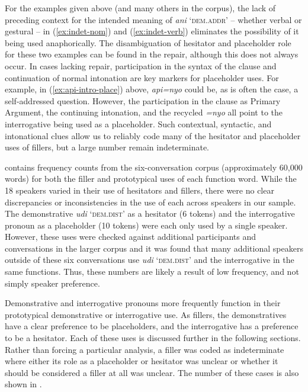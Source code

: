 \documentclass[output=paper,colorlinks,citecolor=brown
\ChapterDOI{10.5281/zenodo.15697585}
]{langscibook}
\begin{document}
For the examples given above (and many others in the corpus), the lack of preceding context for the intended meaning of \textit{ani} `\textsc{dem.addr}' -- whether verbal or gestural -- in (\ref{ex:indet-nom}) and (\ref{ex:indet-verb}) eliminates the possibility of it being used anaphorically. The disambiguation of hesitator and placeholder role for these two examples can be found in the repair, although this does not always occur. In cases lacking repair, participation in the syntax of the clause and continuation of normal intonation are key markers for placeholder uses. For example, in (\ref{ex:api-intro-place}) above, \textit{api=nyo} could be, as is often the case, a self-addressed question. However, the participation in the clause as Primary Argument, the continuing intonation, and the recycled \textit{=nyo} all point to the interrogative being used as a placeholder. Such contextual, syntactic, and intonational clues allow us to reliably code many of the hesitator and placeholder uses of fillers, but a large number remain indeterminate.

 contains frequency counts from the six-conversation corpus (approximately 60,000 words) for both the filler and prototypical uses of each function word. While the 18 speakers varied in their use of hesitators and fillers, there were no clear discrepancies or inconsistencies in the use of each across speakers in our sample. The demonstrative \textit{udi} `\textsc{dem.dist}' as a hesitator (6 tokens) and the interrogative pronoun as a placeholder (10 tokens) were each only used by a single speaker. However, these uses were checked against additional participants and conversations in the larger corpus and it was found that many additional speakers outside of these six conversations use \textit{udi} `\textsc{dem.dist}' and the interrogative in the same functions. Thus, these numbers are likely a result of low frequency, and not simply speaker preference.

Demonstrative and interrogative pronouns more frequently function in their prototypical demonstrative or interrogative use. As fillers, the demonstratives have a clear preference to be placeholders, and the interrogative has a preference to be a hesitator. Each of these uses is discussed further in the following sections. Rather than forcing a particular analysis, a filler was coded as indeterminate where either its role as a placeholder or hesitator was unclear or whether it should be considered a filler at all was unclear. The number of these cases is also shown in .
\end{document}
